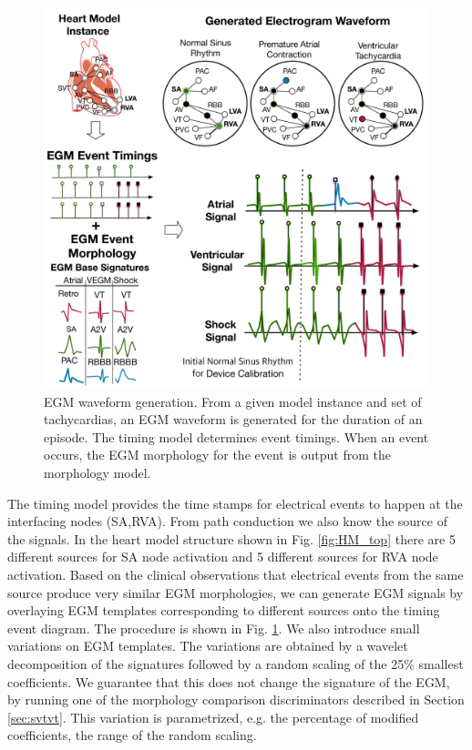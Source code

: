 \begin{figure}[t]
	\centering
	\includegraphics[scale=0.4]{figures/figEGMGeneration1column.pdf}
	\caption{\small EGM waveform generation.
		From a given model instance and set of tachycardias, an EGM waveform is generated for the duration of an episode. The timing model determines event timings. When an event occurs, the EGM morphology for the event is output from the morphology model.  
		}
	\label{fig:egmGeneration}
\end{figure}
The timing model provides the time stamps for electrical events to happen at the interfacing nodes (SA,RVA). 
From path conduction we also know the source of the signals.
In the heart model structure shown in Fig. \ref{fig:HM_top} there are 5 different sources for SA node activation and 5 different sources for RVA node activation. 
Based on the clinical observations that electrical events from the same source produce very similar EGM morphologies, we can generate EGM signals by overlaying EGM templates corresponding to different sources onto the timing event diagram.
The procedure is shown in Fig. \ref{fig:egmGeneration}.
We also introduce small variations on EGM templates.
The variations are obtained by a wavelet decomposition of the signatures followed by a random scaling of the 25\% smallest coefficients.
We guarantee that this does not change the signature of the EGM, by running one of the morphology comparison discriminators described in Section \ref{sec:svtvt}.
This variation is parametrized, e.g. the percentage of modified coefficients, the range of the random scaling.

